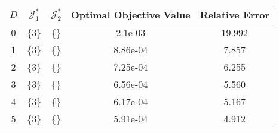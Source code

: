 \begin{subtable}{\textwidth}
\centering
\begin{tabular}{|c|c|c|c|c|}
  \hline
$D$ & $\mathcal J_1^*$ & $\mathcal J_2^*$ & Optimal Objective Value & Relative Error \\ 
  \hline
0 & \{3\} & \{\} & 2.1e-03 & 19.992 \\ 
  1 & \{3\} & \{\} & 8.86e-04 & 7.857 \\ 
  2 & \{3\} & \{\} & 7.25e-04 & 6.255 \\ 
  3 & \{3\} & \{\} & 6.56e-04 & 5.560 \\ 
  4 & \{3\} & \{\} & 6.17e-04 & 5.167 \\ 
  5 & \{3\} & \{\} & 5.91e-04 & 4.912 \\ 
   \hline
\end{tabular}
\end{subtable}
